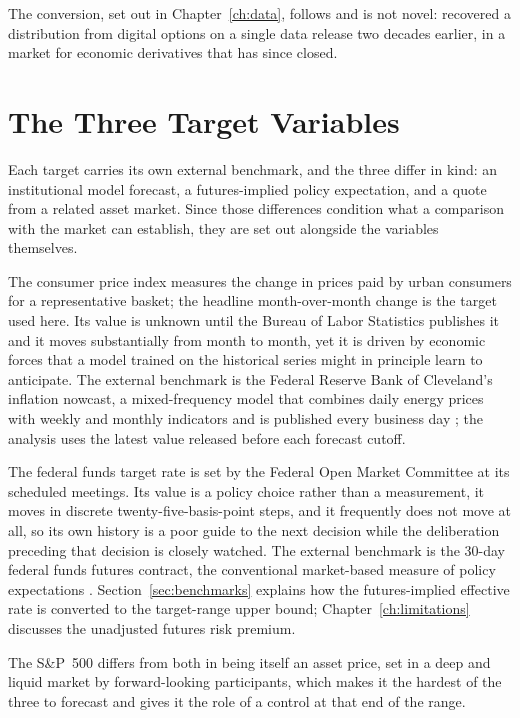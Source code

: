 \documentclass[12pt,a4paper]{report}
\begin{document}
The conversion, set out in
Chapter~\ref{ch:data}, follows \textcite{diercks2026} and is not novel:
\textcite{gurkaynak2006} recovered a distribution from digital options on a
single data release two decades earlier, in a market for economic derivatives
that has since closed.

\section{The Three Target Variables}
\label{sec:setting-targets}

Each target carries its own external benchmark, and the three differ in kind:
an institutional model forecast, a futures-implied policy expectation, and a
quote from a related asset market. Since those differences condition what a
comparison with the market can establish, they are set out alongside the
variables themselves.

The consumer price index measures the change in prices paid by urban consumers
for a representative basket; the headline month-over-month change is the
target used here. Its value is unknown until the Bureau of Labor Statistics
publishes it and it moves substantially from month to month, yet it is driven
by economic forces that a model trained on the historical series might in
principle learn to anticipate. The external benchmark is the Federal Reserve
Bank of Cleveland's inflation nowcast, a mixed-frequency model that combines
daily energy prices with weekly and monthly indicators and is published every
business day \parencite{knotek2017}; the analysis uses the latest value
released before each forecast cutoff.

The federal funds target rate is set by the Federal Open Market Committee at
its scheduled meetings. Its value is a policy choice rather than a
measurement, it moves in discrete twenty-five-basis-point steps, and it
frequently does not move at all, so its own history is a poor guide to the
next decision while the deliberation preceding that decision is closely
watched. The external benchmark is the 30-day federal funds futures contract,
the conventional market-based measure of policy expectations
\parencite{gurkaynak2007}. Section~\ref{sec:benchmarks} explains how the
futures-implied effective rate is converted to the target-range upper bound;
Chapter~\ref{ch:limitations} discusses the unadjusted futures risk premium.

The S\&P~500 differs from both in being itself an asset price, set in a deep
and liquid market by forward-looking participants, which makes it the hardest
of the three to forecast and gives it the role of a control at that end of the
range.
\end{document}
